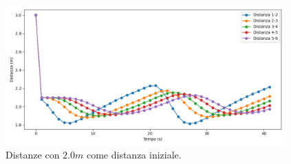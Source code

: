 \begin{figure}[H]
    \includegraphics[width=0.96\textwidth]{images/5-experiment/car-spacing/distance_2.png}
    \caption{Distanze con $2.0 m$ come distanza iniziale.}
    \label{fig:2-space-distance}
\end{figure}

